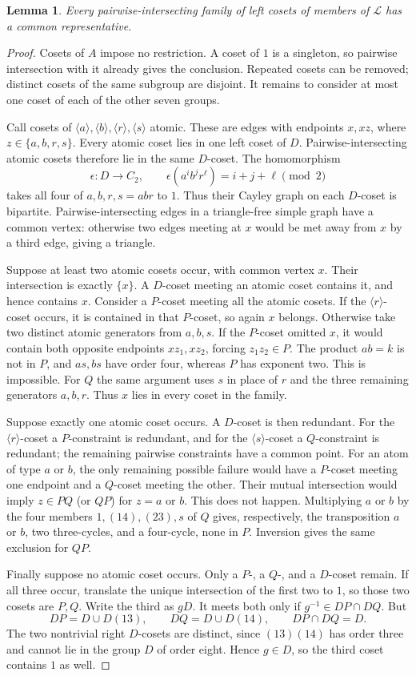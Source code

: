\documentclass[11pt,a4paper]{article}
\newtheorem{lemma}[theorem]{Lemma}
\newcommand{\gen}[1]{\langle #1\rangle}
\begin{document}
\begin{lemma}\label{lem:helly}
Every pairwise-intersecting family of left cosets of members of
$\mathcal L$ has a common representative.
\end{lemma}
\begin{proof}
Cosets of $A$ impose no restriction. A coset of $1$ is a singleton, so
pairwise intersection with it already gives the conclusion. Repeated
cosets can be removed; distinct cosets of the same subgroup are disjoint.
It remains to consider at most one coset of each of the other seven groups.

Call cosets of $\gen a,\gen b,\gen r,\gen s$ atomic. These are edges
with endpoints $x,xz$, where $z\in\{a,b,r,s\}$. Every atomic coset lies
in one left coset of $D$. Pairwise-intersecting atomic cosets therefore
lie in the same $D$-coset. The homomorphism
\[
 \epsilon:D\longrightarrow C_2,\qquad
 \epsilon(a^i b^j r^\ell)=i+j+\ell\pmod2
\]
takes all four of $a,b,r,s=abr$ to $1$. Thus their Cayley graph on each
$D$-coset is bipartite. Pairwise-intersecting edges in a triangle-free
simple graph have a common vertex: otherwise two edges meeting at $x$
would be met away from $x$ by a third edge, giving a triangle.

Suppose at least two atomic cosets occur, with common vertex $x$.
Their intersection is exactly $\{x\}$. A $D$-coset meeting an atomic
coset contains it, and hence contains $x$. Consider a $P$-coset meeting
all the atomic cosets. If the $\gen r$-coset occurs, it is contained in
that $P$-coset, so again $x$ belongs. Otherwise take two distinct atomic
generators from $a,b,s$. If the $P$-coset omitted $x$, it would contain
both opposite endpoints $xz_1,xz_2$, forcing $z_1z_2\in P$.
The product $ab=k$ is not in $P$, and $as,bs$ have order four, whereas
$P$ has exponent two. This is impossible. For $Q$ the same argument
uses $s$ in place of $r$ and the three remaining generators $a,b,r$.
Thus $x$ lies in every coset in the family.

Suppose exactly one atomic coset occurs. A $D$-coset is then redundant.
For the $\gen r$-coset a $P$-constraint is redundant, and for the
$\gen s$-coset a $Q$-constraint is redundant; the remaining pairwise
constraints have a common point. For an atom of type $a$ or $b$, the only
remaining possible failure would have a $P$-coset meeting one endpoint
and a $Q$-coset meeting the other. Their mutual intersection would imply
$z\in PQ$ (or $QP$) for $z=a$ or $b$. This does not happen. Multiplying
$a$ or $b$ by the four members $1,(14),(23),s$ of $Q$ gives, respectively,
the transposition $a$ or $b$, two three-cycles, and a four-cycle, none in
$P$. Inversion gives the same exclusion for $QP$.

Finally suppose no atomic coset occurs. Only a $P$-, a $Q$-, and a
$D$-coset remain. If all three occur, translate the unique intersection
of the first two to $1$, so those two cosets are $P,Q$. Write the third
as $gD$. It meets both only if $g^{-1}\in DP\cap DQ$. But
\[
 DP=D\cup D(13),\qquad DQ=D\cup D(14),\qquad DP\cap DQ=D.
\]
The two nontrivial right $D$-cosets are distinct, since $(13)(14)$ has
order three and cannot lie in the group $D$ of order eight. Hence
$g\in D$, so the third coset contains $1$ as well.
\end{proof}
\end{document}
